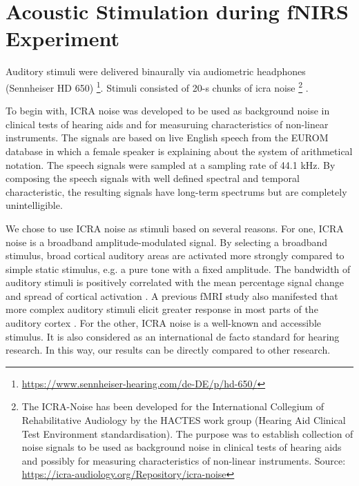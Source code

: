 \section {Acoustic Stimulation during fNIRS Experiment}
Auditory stimuli were delivered binaurally via audiometric headphones (Sennheiser HD 650) \footnote {\url{https://www.sennheiser-hearing.com/de-DE/p/hd-650/}}. Stimuli consisted of 20-s chunks of \acrshort{icra} noise \footnote {The ICRA-Noise has been developed for the International Collegium of Rehabilitative Audiology by the HACTES work group (Hearing Aid Clinical Test Environment standardisation). The purpose was to establish collection of noise signals to be used as background noise in clinical tests of hearing aids and possibly for measuring characteristics of non-linear instruments. Source: \url{https://icra-audiology.org/Repository/icra-noise}} \citep {Dreschler}. 

To begin with, ICRA noise was developed to be used as background noise in clinical tests of hearing aids and for measuruing characteristics of non-linear instruments. The signals are based on live English speech from the EUROM database \citep {chanEUROM} in which a female speaker is explaining about the system of arithmetical notation. The speech signals were sampled at a sampling rate of 44.1 kHz. By composing the speech signals with well defined spectral and temporal characteristic, the resulting signals have long-term spectrums but are completely unintelligible. 
 
We chose to use ICRA noise as stimuli based on several reasons. For one, ICRA noise is a broadband amplitude-modulated signal. By selecting a broadband stimulus, broad cortical auditory areas are activated more strongly compared to simple static stimulus, e.g. a pure tone with a fixed amplitude. The bandwidth of auditory stimuli is positively correlated with the mean percentage signal change and spread of cortical activation \citep {Hall}. A previous fMRI study also manifested that more complex auditory stimuli elicit greater response in most parts of the auditory cortex \citep {Belin2002}. For the other, ICRA noise is a well-known and accessible stimulus. It is also considered as an international de facto standard for hearing research. In this way, our results can be directly compared to other research.
 
